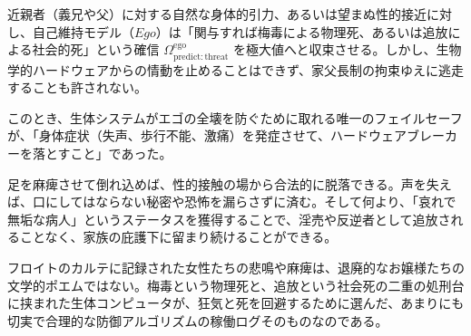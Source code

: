 近親者（義兄や父）に対する自然な身体的引力、あるいは望まぬ性的接近に対し、自己維持モデル（$Ego$）は「関与すれば梅毒による物理死、あるいは追放による社会的死」という確信 $\Omega_{\mathrm{predict:threat}}^{\mathrm{ego}}$ を極大値へと収束させる。しかし、生物学的ハードウェアからの情動を止めることはできず、家父長制の拘束ゆえに逃走することも許されない。

このとき、生体システムがエゴの全壊を防ぐために取れる唯一のフェイルセーフが、「身体症状（失声、歩行不能、激痛）を発症させて、ハードウェアブレーカーを落とすこと」であった。

足を麻痺させて倒れ込めば、性的接触の場から合法的に脱落できる。声を失えば、口にしてはならない秘密や恐怖を漏らさずに済む。そして何より、「哀れで無垢な病人」というステータスを獲得することで、淫売や反逆者として追放されることなく、家族の庇護下に留まり続けることができる。

フロイトのカルテに記録された女性たちの悲鳴や麻痺は、退廃的なお嬢様たちの文学的ポエムではない。梅毒という物理死と、追放という社会死の二重の処刑台に挟まれた生体コンピュータが、狂気と死を回避するために選んだ、あまりにも切実で合理的な防御アルゴリズムの稼働ログそのものなのである。


